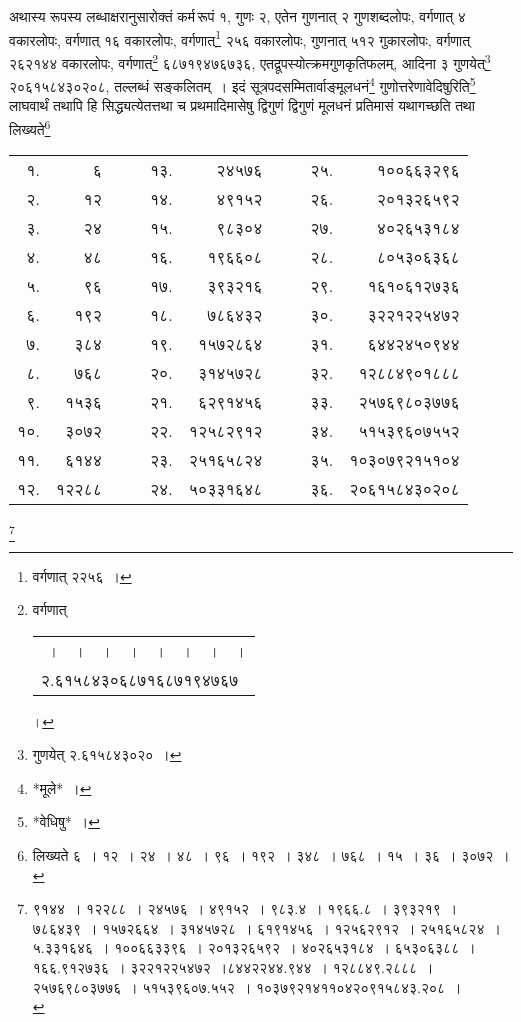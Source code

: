 \documentclass[10pt, openany]{book}
\begin{document}
{{{{{{{{{{{{अथास्य रूपस्य लब्धाक्षरानुसारोक्तं कर्म\textendash \,रूपं १, गुणः २, एतेन गुणनात्
२ गुणशब्दलोपः, वर्गणात् ४ वकारलोपः, वर्गणात् १६ वकारलोपः, वर्गणात्\renewcommand{\thefootnote}{२}\footnote{वर्गणात् २२५६~।} २५६
वकारलोपः,}
{गुणनात् ५१२ गुकारलोपः, वर्गणात् २६२१४४ वकारलोपः, वर्गणात्\renewcommand{\thefootnote}{३}\footnote{वर्गणात् \begin{tabular}{l}~। \,~। \,~। \,~। \,~। \,~। \,~। \,~। \\ २.६१५८४३०६८७१६८७१९४७६७\end{tabular}।}
६८७१९४७६७३६,}
{एतद्रूपस्योत्क्रमगुणकृतिफलम्, आदिना ३ गुणयेत्\renewcommand{\thefootnote}{४}\footnote{गुणयेत् २.६१५८४३०२०~।} २०६१५८४३०२०८,
तल्लब्धं सङ्कलितम्~।}
{इदं सूत्रपदसम्मितार्वाङ्मूलधनं\renewcommand{\thefootnote}{५}\footnote{*मूले*~।} गुणोत्तरेणावेदिषुरिति\renewcommand{\thefootnote}{६}\footnote{*वेधिषु*~।}
लाघवार्थं तथापि हि सिद्ध्यत्येतत्तथा च}
{प्रथमादिमासेषु द्विगुणं द्विगुणं मूलधनं प्रतिमासं यथागच्छति तथा
लिख्यते\renewcommand{\thefootnote}{७}\footnote{लिख्यते
६~। १२~। २४~। ४८~। ९६~। १९२~। ३४८~। ७६८~। १५~। ३६~। ३०७२~।}\textendash}

\renewcommand*{\arraystretch}{1}
\begin{center}
\begin{tabular}{rrrrrr}
 १. & ६ & ~~~~१३. & २४५७६ & ~~~~२५. & १००६६३२९६ \\
 २. & १२ & १४. & ४९१५२ & २६. & २०१३२६५९२\\
 ३. & २४ & १५. & ९८३०४ & २७. & ४०२६५३१८४\\
 ४. & ४८ & १६. & १९६६०८ & २८. & ८०५३०६३६८\\
 ५. & ९६ & १७. & ३९३२१६ & २९. & १६१०६१२७३६\\
 ६. & १९२ & १८. & ७८६४३२ & ३०. & ३२२१२२५४७२\\
 ७. & ३८४ & १९. & १५७२८६४ & ३१. & ६४४२४५०९४४\\
 ८. & ७६८ & २०. & ३१४५७२८ & ३२. & १२८८४९०१८८८\\
 ९. & १५३६ & २१. & ६२९१४५६ & ३३. & २५७६९८०३७७६\\
 १०. & ३०७२ & २२. & १२५८२९१२ & ३४. & ५१५३९६०७५५२\\
 ११. & ६१४४ & २३. & २५१६५८२४ & ३५. & १०३०७९२१५१०४\\
 १२. & १२२८८ & २४. & ५०३३१६४८ & ३६. & २०६१५८४३०२०८\\
\end{tabular}
\end{center}

\newpage

\renewcommand*{\arraystretch}{0.7}
\renewcommand{\thefootnote}{}\footnote{\hspace{-3.5mm} ९१४४~। १२२८८~। २४५७६~। ४९१५२~। ९८३.४~। १९६६.८~। ३९३२१९~। ७८६४३९~। १५७२६६४~। ३१४५७२८~। ६१९१४५६~। १२५६२९१२~। २५१६५८२४~। ५.३३१६४६~। १००६६३३९६~। २०१३२६५९२~। ४०२६५३१८४~। ६५३०६३८८~। १६६.९१२७३६~। ३२२१२२५४७२~।८४४२२४४.९४४~। १२८८४९.२८८८~। २५७६९८०३७७६~। ५१५३९६०७.५५२~। १०३७९२१४११०४२०९१५८४३.२०८~। \\
\vspace{1mm}}

}}}}}}}}}}}
\end{document}
